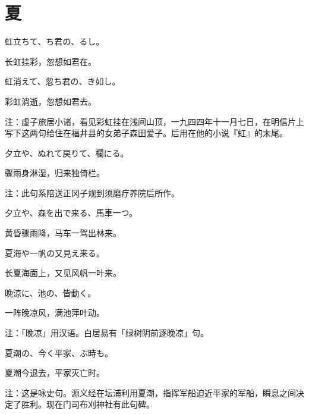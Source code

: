 \section{\FK 夏}

\setcounter{haikucounter}{0}

\begin{haiku}
    {\FH 虹立ちて、ち君の、るし。}

    {\FK 长虹挂彩，忽想如君在。}
\end{haiku}

\begin{haiku}
    {\FH 虹消えて、忽ち君の、き如し。}

    {\FK 彩虹淌逝，忽想如君去。}

    {\FT 注：虚子旅居小诸，看见彩虹挂在浅间山顶，一九四四年十一月七日，在明信片上写下这两句给住在福井县的女弟子森田爱子。后用在他的小说『虹』的末尾。}
\end{haiku}

\begin{haiku}
    {\FH 夕立や、ぬれて戻りて、欄にる。}

    {\FK 骤雨身淋湿，归来独倚栏。}

    {\FT 注：此句系陪送正冈子规到须磨疗养院后所作。}
\end{haiku}

\begin{haiku}
    {\FH 夕立や、森を出で来る、馬車一つ。}

    {\FK 黄昏骤雨降，马车一驾出林来。}
\end{haiku}

\begin{haiku}
    {\FH 夏海や一帆の又見え来る。}

    {\FK 长夏海面上，又见风帆一叶来。}
\end{haiku}

\begin{haiku}
    {\FH 晩涼に、池の、皆動く。}

    {\FK 一阵晚凉风，满池萍叶动。}

    {\FT 注：「晚凉」用汉语。白居易有「绿树阴前逐晚凉」句。}
\end{haiku}

\begin{haiku}
    {\FH 夏潮の、今く平家、ぶ時も。}

    {\FK 夏潮今退去，平家灭亡时。}

    {\FT 注：这是咏史句。源义经在坛浦利用夏潮，指挥军船迫近平家的军船，瞬息之间决定了胜利。现在门司布刈神社有此句碑。}
\end{haiku}


